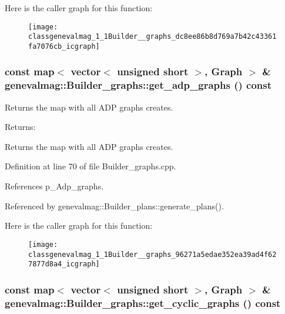 Here is the caller graph for this function:\nopagebreak
\begin{figure}[H]
\begin{center}
\leavevmode
\texttt{[image: classgenevalmag\_1\_1Builder\_\_graphs\_dc8ee86b8d769a7b42c43361fa7076cb\_icgraph]}
\end{center}
\end{figure}
\hypertarget{classgenevalmag_1_1Builder__graphs_96271a5edae352ea39ad4f627877d8a4}{
\subsubsection[{get\_\-adp\_\-graphs}]{\setlength{\rightskip}{0pt plus 5cm}const map$<$ vector$<$ unsigned short $>$, {\bf Graph} $>$ \& genevalmag::Builder\_\-graphs::get\_\-adp\_\-graphs () const}}
\label{classgenevalmag_1_1Builder__graphs_96271a5edae352ea39ad4f627877d8a4}


Returns the map with all ADP graphs creates. \begin{Desc}
\item[Returns:]\end{Desc}
Returns the map with all ADP graphs creates. 

Definition at line 70 of file Builder\_\-graphs.cpp.

References p\_\-Adp\_\-graphs.

Referenced by genevalmag::Builder\_\-plans::generate\_\-plans().

Here is the caller graph for this function:\nopagebreak
\begin{figure}[H]
\begin{center}
\leavevmode
\texttt{[image: classgenevalmag\_1\_1Builder\_\_graphs\_96271a5edae352ea39ad4f627877d8a4\_icgraph]}
\end{center}
\end{figure}
\hypertarget{classgenevalmag_1_1Builder__graphs_4abbda95aa3d42fc06328c31ff5d63e1}{
\subsubsection[{get\_\-cyclic\_\-graphs}]{\setlength{\rightskip}{0pt plus 5cm}const map$<$ vector$<$ unsigned short $>$, {\bf Graph} $>$ \& genevalmag::Builder\_\-graphs::get\_\-cyclic\_\-graphs () const}}
\label{classgenevalmag_1_1Builder__graphs_4abbda95aa3d42fc06328c31ff5d63e1}


